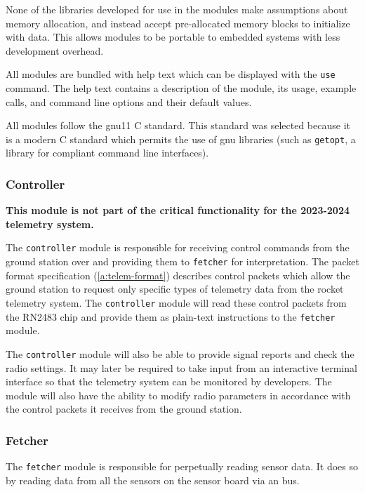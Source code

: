 None of the libraries developed for use in the modules make assumptions about memory allocation, and instead accept
pre-allocated memory blocks to initialize with data. This allows modules to be portable to embedded systems with less
development overhead.

All modules are bundled with help text which can be displayed with the \texttt{use} command. The help text contains a
description of the module, its usage, example calls, and command line options and their default values.

All modules follow the gnu11 C standard. This standard was selected because it is a modern C standard which permits the
use of \gls{gnu} libraries (such as \texttt{getopt}, a library for  compliant command line
interfaces).

\subsubsection{Controller}

\textbf{This module is not part of the critical functionality for the 2023-2024  telemetry
    system.}

The \texttt{controller} module is responsible for receiving control commands from the ground station over
 and providing them to \texttt{fetcher} for interpretation. The  packet format
specification (\ref{a:telem-format}) describes control packets which allow the ground station to request only specific
types of telemetry data from the rocket telemetry system. The \texttt{controller} module will read these control
packets from the  RN2483 chip and provide them as plain-text instructions to the \texttt{fetcher}
module.

The \texttt{controller} module will also be able to provide signal reports and check the  radio
settings. It may later be required to take input from an interactive terminal interface so that the telemetry system
can be monitored by developers. The module will also have the ability to modify radio parameters in accordance with the
control packets it receives from the ground station.

\subsubsection{Fetcher}

The \texttt{fetcher} module is responsible for perpetually reading sensor data. It does so by reading data from all the
sensors on the   sensor board via an  bus.

